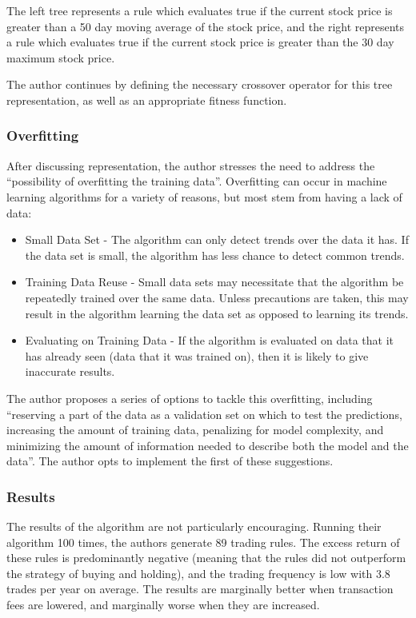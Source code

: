 The left tree represents a rule which evaluates true if the current stock price is greater than a 50 day moving average of the stock price, and the right represents a rule which evaluates true if the current stock price is greater than the 30 day maximum stock price. \newline 

The author continues by defining the necessary crossover operator for this tree representation, as well as an appropriate fitness function.

\subsubsection{Overfitting}
After discussing representation, the author stresses the need to address the ``possibility of overfitting the training data''. Overfitting can occur in machine learning algorithms for a variety of reasons, but most stem from having a lack of data:
\begin{itemize}
    \item Small Data Set - The algorithm can only detect trends over the data it has. If the data set is small, the algorithm has less chance to detect common trends.
    \item Training Data Reuse - Small data sets may necessitate that the algorithm be repeatedly trained over the same data. Unless precautions are taken, this may result in the algorithm learning the data set as opposed to learning its trends.
    \item Evaluating on Training Data - If the algorithm is evaluated on data that it has already seen (data that it was trained on), then it is likely to give inaccurate results.
\end{itemize}

The author proposes a series of options to tackle this overfitting, including ``reserving
a part of the data as a validation set on which to test the predictions, increasing
the amount of training data, penalizing for model complexity, and minimizing
the amount of information needed to describe both the model and the data''. The author opts to implement the first of these suggestions.

\subsubsection{Results}
The results of the algorithm are not particularly encouraging. Running their algorithm 100 times, the authors generate 89 trading rules. The excess return of these rules is predominantly negative (meaning that the rules did not outperform the strategy of buying and holding), and the trading frequency is low with 3.8 trades per year on average. The results are marginally better when transaction fees are lowered, and marginally worse when they are increased. \newline


